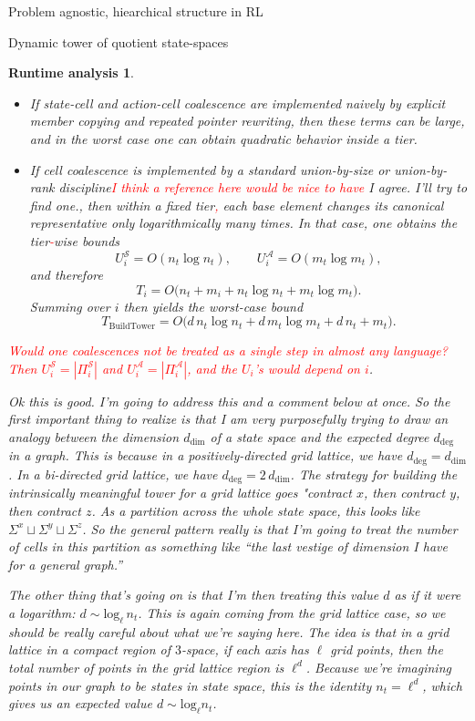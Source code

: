 \documentclass[11pt]{article}
\newtheorem{run_analysis}[subsubsection]{Runtime analysis}
\begin{document}
\begin{section}{Problem agnostic, hiearchical structure in RL}
\begin{subsection}{Dynamic tower of quotient state-spaces}
\begin{run_analysis}
\begin{itemize}
    \item If state-cell and action-cell coalescence are implemented naively by explicit member copying and repeated pointer rewriting, then these terms can be large, and in the worst case one can obtain quadratic behavior inside a tier.

    \item If cell coalescence is implemented by a standard union-by-size or union-by-rank discipline\textcolor{red}{I think a reference here would be nice to have} {\color{blue} I agree. I'll try to find one.}, then within a fixed tier\textcolor{red}{,} each base element changes its canonical representative only logarithmically many times. In that case, one obtains the tier\textcolor{red}{-}wise bounds
    \[
    U_i^{\mathcal S}=O(n_t\log n_t),
    \qquad
    U_i^{\mathcal A}=O(m_t\log m_t),
    \]
    and therefore
    \[
    T_i
    =
    O\bigl(n_t + m_i + n_t\log n_t + m_t\log m_t\bigr).
    \]
    Summing over $i$ then yields the worst-case bound
    \[
    T_{\mathrm{BuildTower}}
    =
    O\bigl(
    d\,n_t\log n_t + d\,m_t\log m_t + d\,n_t + m_t
    \bigr).
    \]
\end{itemize}
\textcolor{red}{Would one coalescences not be treated as a single step in almost any language? Then $U^{\mathcal{S}}_i = \left\vert\Pi^{\mathcal{S}}_i\right\vert$ and $U^{\mathcal{A}}_i = \left\vert\Pi^{\mathcal{A}}_i\right\vert$, and the $U_i$'s would depend on $i$}. {\color{blue} Ok this is good. I'm going to address this and a comment below at once. So the first important thing to realize is that I am very purposefully trying to draw an analogy between the dimension $d_\text{dim}$ of a state space and the expected degree $d_\text{deg}$ in a graph. This is because in a positively-directed grid lattice, we have $d_\text{deg}=d_\text{dim}$. In a bi-directed grid lattice, we have $d_\text{deg}=2\,d_\text{dim}$. The strategy for building the intrinsically meaningful tower for a grid lattice goes "contract $x$, then contract $y$, then contract $z$. As a partition across the whole state space, this looks like $\Sigma^x \sqcup \Sigma^y \sqcup \Sigma^z$. So the general pattern really is that I'm going to treat the number of cells in this partition as something like ``the last vestige of dimension I have for a general graph.''

The other thing that's going on is that I'm then treating this value $d$ as if it were a logarithm: $d\sim \text{log}_{\ell}\,n_{t}$. This is again coming from the grid lattice case, so we should be really careful about what we're saying here. The idea is that in a grid lattice {\em in a compact region of $3$-space}, if each axis has $\ell$ grid points, then the total number of points in the grid lattice region is $\ell^{d}$. Because we're imagining points in our graph to be states in state space, this is the identity $n_{t}=\ell^{d}$, which gives us an expected value $d\sim \text{log}_{\ell}n_{t}$.
}

\end{run_analysis}
\end{subsection}
\end{section}
\end{document}
